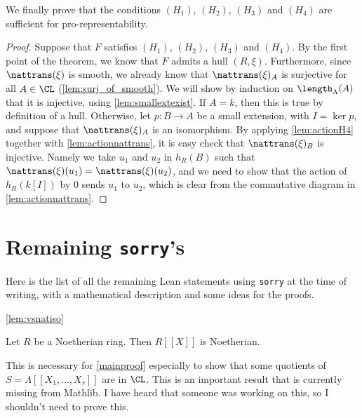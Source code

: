 We finally prove that the conditions $(H_1)$, $(H_2)$, $(H_3)$
and $(H_4)$ are sufficient for pro-representability.

\begin{proof}
  \leanok
  Suppose that $F$ satisfies $(H_1)$, $(H_2)$, $(H_3)$ and $(H_4)$.
  By the first point of the theorem, we know that $F$ admits a hull
  $(R, \xi)$. Furthermore, since $\nattrans(\xi)$ is smooth, we
  already know
  that $\nattrans(\xi)_A$ is surjective for all $A \in \CL$
  (\cref{lem:surj_of_smooth}).
  We will show by induction on $\length_\Lambda (A)$ that it is
  injective, using \cref{lem:smallextexist}.
  If $A = k$, then this is true by definition of a hull.
  Otherwise, let $p : B \to A$ be a small extension, with $I = \ker p$,
  and suppose that $\nattrans(\xi)_A$ is an isomorphism.
  By applying \cref{lem:actionH4} together with \cref{lem:actionnattrans},
  it is easy check that $\nattrans(\xi)_B$ is injective. Namely we take
  $u_1$ and $u_2$ in $h_R(B)$ such that
  $\nattrans(\xi) (u_1) = \nattrans(\xi) (u_2)$, and we need to show that
  the action of $h_R(k[I])$ by $0$ sends $u_1$ to $u_2$,
  which is clear from the commutative diagram in \cref{lem:actionnattrans}.
\end{proof}

\chapter{Remaining \texttt{sorry}'s}
\label{sec:sorries}

Here is the list of all the remaining Lean statements using \texttt{sorry}
at the time of writing, with a mathematical description and some ideas
for the proofs.

\cref{lem:vsnatiso}

\begin{lemma}
  \label{lem:powerseriesnoetherian}
  \leanok
  Let $R$ be a Noetherian ring. Then $R[[X]]$ is Noetherian.
\end{lemma}
This is necessary for \cref{mainproof} especially to show that some quotients
of $S = \Lambda[[X_1, \ldots, X_r]]$ are in $\CL$.
This is an important result that is currently missing from Mathlib. I
have heard that someone was working on this, so I shouldn't need to
prove this.


